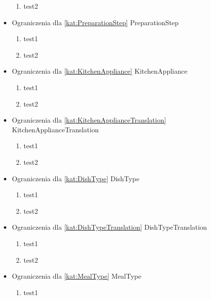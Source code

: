 \begin{itemize}[label={}]
\begin{enumerate}[label={\textbf{OGR/\protect\threedigits{\arabic{enumi}}}}, wide, labelwidth=!, resume]
        \item test2
    \end{enumerate}
    \item Ograniczenia dla \ref{kat:PreparationStep} PreparationStep
    \begin{enumerate}[label={\textbf{OGR/\protect\threedigits{\arabic{enumi}}}}, wide, labelwidth=!, resume]
        \item test1
        \item test2
    \end{enumerate}
    \item Ograniczenia dla \ref{kat:KitchenAppliance} KitchenAppliance
    \begin{enumerate}[label={\textbf{OGR/\protect\threedigits{\arabic{enumi}}}}, wide, labelwidth=!, resume]
        \item test1
        \item test2
    \end{enumerate}
    \item Ograniczenia dla \ref{kat:KitchenApplianceTranslation} KitchenApplianceTranslation
    \begin{enumerate}[label={\textbf{OGR/\protect\threedigits{\arabic{enumi}}}}, wide, labelwidth=!, resume]
        \item test1
        \item test2
    \end{enumerate}
    \item Ograniczenia dla \ref{kat:DishType} DishType
    \begin{enumerate}[label={\textbf{OGR/\protect\threedigits{\arabic{enumi}}}}, wide, labelwidth=!, resume]
        \item test1
        \item test2
    \end{enumerate}
    \item Ograniczenia dla \ref{kat:DishTypeTranslation} DishTypeTranslation
    \begin{enumerate}[label={\textbf{OGR/\protect\threedigits{\arabic{enumi}}}}, wide, labelwidth=!, resume]
        \item test1
        \item test2
    \end{enumerate}
    \item Ograniczenia dla \ref{kat:MealType} MealType
    \begin{enumerate}[label={\textbf{OGR/\protect\threedigits{\arabic{enumi}}}}, wide, labelwidth=!, resume]
        \item test1

\end{enumerate}
\end{itemize}
